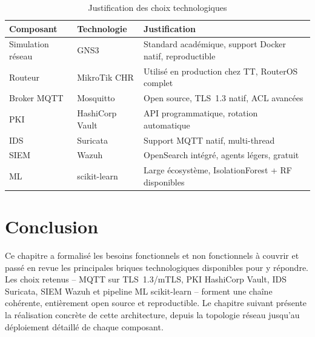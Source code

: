 \begin{table}[H]
\centering
\caption{Justification des choix technologiques}
\label{tab:choix_tech}
\begin{tabular}{llp{6cm}}
\toprule
\textbf{Composant} & \textbf{Technologie} & \textbf{Justification} \\
\midrule
Simulation réseau & GNS3 & Standard académique, support Docker natif, reproductible \\
Routeur & MikroTik CHR & Utilisé en production chez TT, RouterOS complet \\
Broker MQTT & Mosquitto & Open source, TLS~1.3 natif, ACL avancées \\
PKI & HashiCorp Vault & API programmatique, rotation automatique \\
IDS & Suricata & Support MQTT natif, multi-thread \\
SIEM & Wazuh & OpenSearch intégré, agents légers, gratuit \\
ML & scikit-learn & Large écosystème, IsolationForest + RF disponibles \\
\bottomrule
\end{tabular}
\end{table}

\section{Conclusion}

Ce chapitre a formalisé les besoins fonctionnels et non fonctionnels à couvrir et passé en revue les principales briques technologiques disponibles pour y répondre. Les choix retenus -- MQTT sur TLS~1.3/mTLS, PKI HashiCorp Vault, IDS Suricata, SIEM Wazuh et pipeline ML scikit-learn -- forment une chaîne cohérente, entièrement open source et reproductible. Le chapitre suivant présente la réalisation concrète de cette architecture, depuis la topologie réseau jusqu'au déploiement détaillé de chaque composant.
